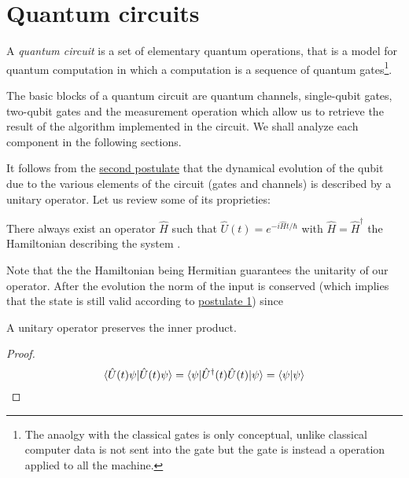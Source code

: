 \section{Quantum circuits}
A \emph{quantum circuit} is a set of elementary quantum operations, that is a model for quantum computation in which a computation is a sequence of quantum gates\footnote{The anaolgy with the classical gates is only conceptual, unlike classical computer data is not sent into the gate but the gate is instead a operation applied to all the machine.}.

The basic blocks of a quantum circuit are quantum channels, single-qubit gates, two-qubit gates and the measurement operation which allow us to retrieve the result of the algorithm implemented in the circuit. We shall analyze each component in the following sections.

It follows from the \hyperref[postulate:2]{second postulate} that the dynamical evolution of the qubit due to the various elements of the circuit (gates and channels) is described by a unitary operator. Let us review some of its proprieties: 
\begin{theorem}\label{theorem:1}
There always exist an operator $\hat{H}$ such that $\hat{U}(t) = e^{-i\hat{H}t/\hbar}$ with $\hat{H} = \hat{H}^\dagger$ the Hamiltonian describing the system \cite[145]{Shankar}.
\end{theorem}

Note that the the Hamiltonian being Hermitian guarantees the unitarity of our operator. After the evolution the norm of the input is conserved (which implies that the state is still valid according to \hyperref[postulate:1]{postulate 1}) since
\begin{theorem}
A unitary operator preserves the inner product.
\end{theorem}
\begin{proof}
\begin{equation*}
    \braket{\hat{U}(t)\psi | \hat{U}(t)\psi} = \braket{ \psi | \hat{U}^\dagger(t)\hat{U}(t) | \psi} = \braket{\psi | \psi}
\end{equation*}
\end{proof}


